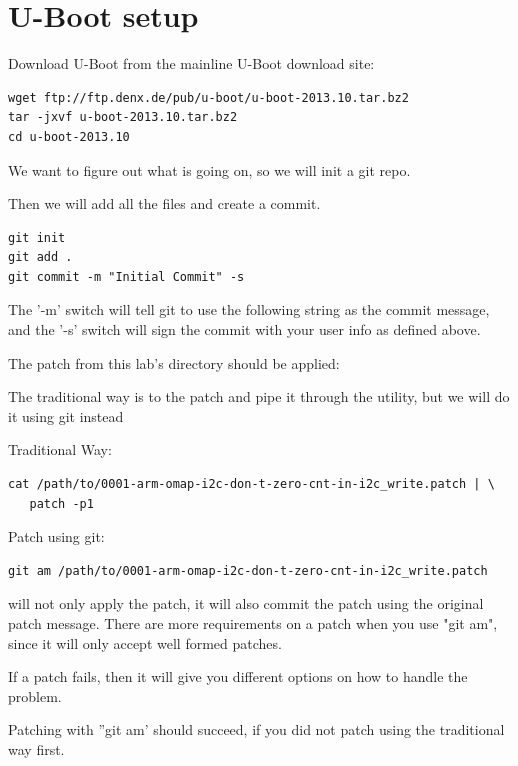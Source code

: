 \section{U-Boot setup}

Download U-Boot from the mainline U-Boot download site:

\begin{verbatim}
wget ftp://ftp.denx.de/pub/u-boot/u-boot-2013.10.tar.bz2
tar -jxvf u-boot-2013.10.tar.bz2
cd u-boot-2013.10
\end{verbatim}

We want to figure out what is going on, so we will init a git repo.

Then we will add all the files and create a commit.

\begin{verbatim}
git init
git add .
git commit -m "Initial Commit" -s
\end{verbatim}

The '-m' switch will tell git to use the following string as the commit message,
and the '-s' switch will sign the commit with your user info as defined above.

The  patch from
this lab's  directory should be applied:

The traditional way is to  the patch and pipe it through the  utility,
but we will do it using git instead

Traditional Way:
{\small
\begin{verbatim}
cat /path/to/0001-arm-omap-i2c-don-t-zero-cnt-in-i2c_write.patch | \
   patch -p1
\end{verbatim}
}

Patch using git:

{\small
\begin{verbatim}
git am /path/to/0001-arm-omap-i2c-don-t-zero-cnt-in-i2c_write.patch
\end{verbatim}
}

 will not only apply the patch, it will also commit the patch
using the original patch message. There are more requirements on a patch
when you use "git am", since it will only accept well formed patches.

If a patch fails, then it will give you different options on how to handle the problem.


Patching with ''git am' should succeed, if you did not patch using the traditional way first.

